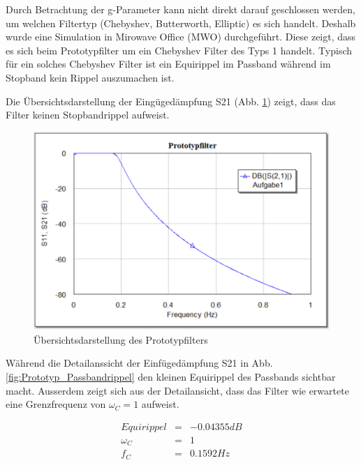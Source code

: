 Durch Betrachtung der g-Parameter kann nicht direkt darauf geschlossen werden, um welchen Filtertyp (Chebyshev, Butterworth, Elliptic) es sich handelt. Deshalb wurde eine Simulation in Mirowave Office (MWO) durchgeführt. Diese zeigt, dass es sich beim Prototypfilter um ein Chebyshev Filter des Typs 1 handelt. Typisch für ein solches Chebyshev Filter ist ein Equirippel im Passband während im Stopband kein Rippel auszumachen ist. 

Die Übersichtsdarstellung der Eingügedämpfung S21 (Abb. \ref{fig:Ovw_Prototyp}) zeigt, dass das Filter keinen Stopbandrippel aufweist.

\begin{figure}[h!]
\centering
 	\includegraphics[width=\imagewidth]{images/Ovw_Prototyp.png}
 	\caption{Übersichtsdarstellung des Prototypfilters}
 	\label{fig:Ovw_Prototyp}
\end{figure}

Während die Detailanssicht der Einfügedämpfung S21 in Abb. \ref{fig:Prototyp_Passbandrippel} den kleinen Equirippel des Passbands sichtbar macht. Ausserdem zeigt sich aus der Detailansicht, dass das Filter wie erwartete eine Grenzfrequenz von $\omega_C = 1$ aufweist.

\begin{mdframed}
\begin{equation*} 
\begin{array}{rclcl} 
Equirippel & = & -0.04355 dB \\ 
\omega_C & = & 1 \\ 
f_C & = & 0.1592 Hz \\ 
\end{array} 
\end{equation*} 
\end{mdframed}

